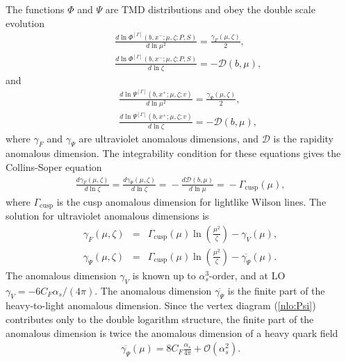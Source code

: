 \documentclass[a4paper, amsfonts, amssymb, amsmath, reprint, showkeys, nofootinbib, twoside]{revtex4-1}
\renewcommand{\(}{\left(}
\renewcommand{\)}{\right)}
\renewcommand{\[}{\left[}
\renewcommand{\]}{\right]}
\begin{document}
The functions $\Phi$ and $\Psi$ are TMD distributions and obey the double scale evolution
\begin{eqnarray}\label{evol:1}
&&\frac{d\ln\Phi^{[\Gamma]}(b,x^-;\mu,\zeta;P,S)}{d\ln\mu^2}=\frac{\gamma_F(\mu,\zeta)}{2},
\\
&&\frac{d\ln\Phi^{[\Gamma]}(b,x^-;\mu,\zeta;P,S)}{d\ln\zeta}=-\mathcal{D}(b,\mu),
\end{eqnarray}
and
\begin{eqnarray}
&&\frac{d\ln\Psi^{[\Gamma]}(b,x^+;\mu,\zeta;v)}{d\ln\mu^2}=\frac{\gamma_{\Psi}(\mu,\zeta)}{2},
\\\label{evol:4}
&&\frac{d\ln\Psi^{[\Gamma]}(b,x^+;\mu,\zeta;v)}{d\ln\zeta}=-\mathcal{D}(b,\mu),
\end{eqnarray}
where $\gamma_F$ and $\gamma_{\Psi}$ are ultraviolet anomalous dimensions, and $\mathcal{D}$ is the rapidity anomalous dimension. The integrability condition for these equations gives the Collins-Soper equation 
\begin{eqnarray}
\!\!\frac{d \gamma_F(\mu,\zeta)}{d\ln \zeta}=\frac{d \gamma_{\Psi}(\mu,\zeta)}{d\ln \zeta}=\!-\frac{d \mathcal{D}(b,\mu)}{d\ln \mu}
=\!-\Gamma_{\text{cusp}}(\mu),
\end{eqnarray}
where $\Gamma_{\text{cusp}}$ is the cusp anomalous dimension for lightlike Wilson lines. The solution for ultraviolet anomalous dimensions is
\begin{eqnarray}
\gamma_F(\mu,\zeta)&=&\Gamma_{\text{cusp}}(\mu)\ln\(\frac{\mu^2}{\zeta}\)-\gamma_V(\mu),
\\
\gamma_{\Psi}(\mu,\zeta)&=&\Gamma_{\text{cusp}}(\mu)\ln\(\frac{\mu^2}{\zeta}\)-\overline{\gamma_{\Psi}}(\mu).
\end{eqnarray}
The anomalous dimension $\gamma_V$ is known up to $\alpha_s^3$-order, and at LO $\gamma_V=-6C_F \alpha_s/(4\pi)$. The anomalous dimension $\overline{\gamma_{\Psi}}$ is the finite part of the heavy-to-light anomalous dimension. Since the vertex diagram (\ref{nlo:Psi}) contributes only to the double logarithm structure, the finite part of the anomalous dimension is twice the anomalous dimension of a heavy quark field \cite{Broadhurst:1991fz}
\begin{eqnarray}
\overline{\gamma_{\Psi}}(\mu)=8C_F\frac{\alpha_s}{4\pi}+\mathcal{O}(\alpha_s^2).
\end{eqnarray}
\end{document}

